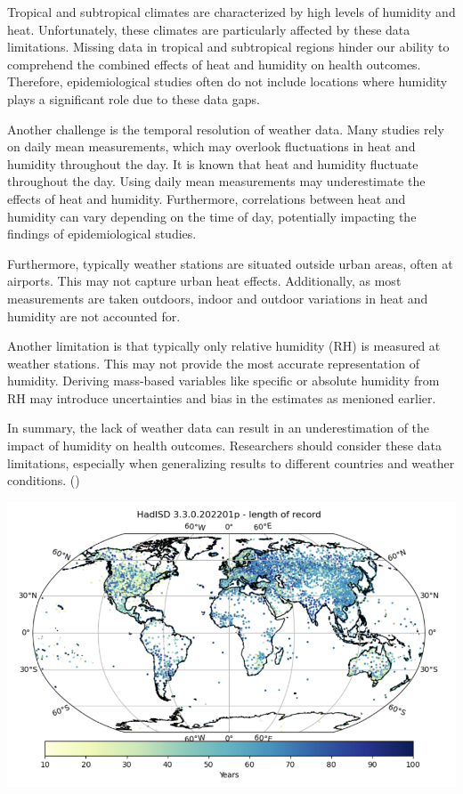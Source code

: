 \documentclass[
]{krantz}
\begin{document}
Tropical and subtropical climates are characterized by high levels of humidity and heat. Unfortunately, these climates are particularly affected by these data limitations. Missing data in tropical and subtropical regions hinder our ability to comprehend the combined effects of heat and humidity on health outcomes. Therefore, epidemiological studies often do not include locations where humidity plays a significant role due to these data gaps.

Another challenge is the temporal resolution of weather data. Many studies rely on daily mean measurements, which may overlook fluctuations in heat and humidity throughout the day. It is known that heat and humidity fluctuate throughout the day. Using daily mean measurements may underestimate the effects of heat and humidity. Furthermore, correlations between heat and humidity can vary depending on the time of day, potentially impacting the findings of epidemiological studies.

Furthermore, typically weather stations are situated outside urban areas, often at airports. This may not capture urban heat effects. Additionally, as most measurements are taken outdoors, indoor and outdoor variations in heat and humidity are not accounted for.

Another limitation is that typically only relative humidity (RH) is measured at weather stations. This may not provide the most accurate representation of humidity. Deriving mass-based variables like specific or absolute humidity from RH may introduce uncertainties and bias in the estimates as menioned earlier.

In summary, the lack of weather data can result in an underestimation of the impact of humidity on health outcomes. Researchers should consider these data limitations, especially when generalizing results to different countries and weather conditions. (\citet{bald})

\begin{center}\includegraphics[width=0.8\linewidth]{hadisdimage1} \end{center}
\end{document}
